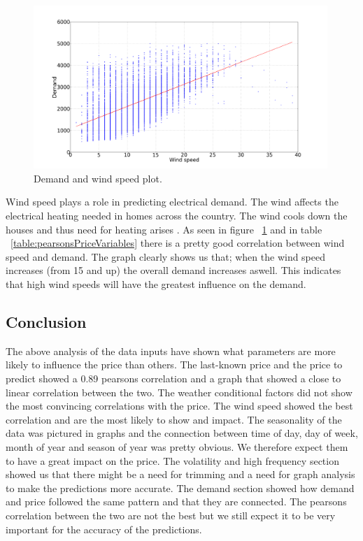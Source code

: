 \begin{figure}[H]
\centering
\includegraphics[width=0.99\textwidth ]{billeder/energy_price_plots/consump_wind.png}
\caption{Demand and wind speed plot.}
\label{fig:consump_wind}
\end{figure}

Wind speed plays a role in predicting electrical demand. The wind affects the electrical heating needed in homes across the country. The wind cools down the houses and thus need for heating arises \cite{19}. As seen in figure ~\ref{fig:consump_wind} and in table ~\ref{table:pearsonsPriceVariables} there is a pretty good correlation between wind speed and demand. The graph clearly shows us that; when the wind speed increases (from 15 and up) the overall demand increases aswell. This indicates that high wind speeds will have the greatest influence on the demand.


\subsection{Conclusion}
The above analysis of the data inputs have shown what parameters are more likely to influence the price than others. The last-known price and the price to predict showed a 0.89 pearsons correlation and a graph that showed a close to linear correlation between the two. The weather conditional factors did not show the most convincing correlations with the price. The wind speed showed the best correlation and are the most likely to show and impact. The seasonality of the data was pictured in graphs and the connection between time of day, day of week, month of year and season of year was pretty obvious. We therefore expect them to have a great impact on the price. The volatility and high frequency section showed us that there might be a need for trimming and a need for graph analysis to make the predictions more accurate. The demand section showed how demand and price followed the same pattern and that they are connected. The pearsons correlation between the two are not the best but we still expect it to be very important for the accuracy of the predictions.